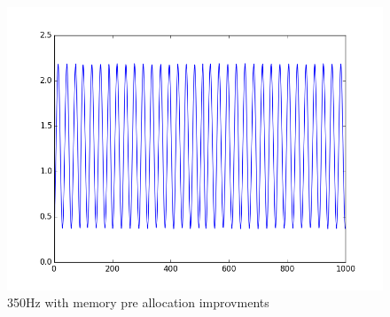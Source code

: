 \documentclass[prl,12pt,notitlepage,aps,onecolumn,superscriptaddress]{revtex4-1}
\begin{document}
\begin{figure}[h]
\begin{center}
\includegraphics[width=.5\columnwidth]{350_array_good.png}
\end{center}
\caption{\label{fig:pic} 350Hz with memory pre allocation improvments}
\end{figure}
\end{document}
